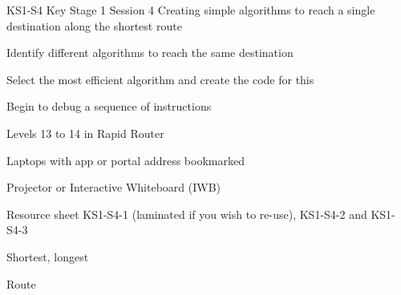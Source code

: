 \documentclass{../../../lessonplan}
\begin{document}
\lessonplantitle
    {KS1-S4}
    {Key Stage 1 Session 4}
    {Creating simple algorithms to reach a single destination along the shortest route}

\preamble
    {
    \item Identify different algorithms to reach the same destination
    \item Select the most efficient algorithm and create the code for this
    \item Begin to debug a sequence of instructions
    }
    {
    \item Levels 13 to 14 in Rapid Router
    \item Laptops with app or portal address bookmarked
    \item Projector or Interactive Whiteboard (IWB)
    \item Resource sheet KS1-S4-1 (laminated if you wish to re-use), KS1-S4-2 and KS1-S4-3
    }
    {
    \item Shortest, longest
    \item Route
    }
\end{document}
